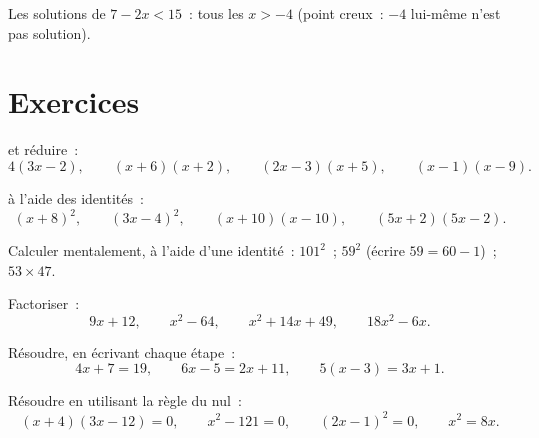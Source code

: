 \begin{omfigure}

{\small Les solutions de $7 - 2x < 15$~: tous les $x > -4$ (point
creux~: $-4$ lui-même n'est pas solution).}
\end{omfigure}

\section{Exercices}

\begin{exercise}[$\star$]\label{exo:g9:algebra:1}
 et réduire~:
\[
4(3x - 2), \qquad
(x + 6)(x + 2), \qquad
(2x - 3)(x + 5), \qquad
(x - 1)(x - 9).
\]
\end{exercise}

\begin{exercise}[$\star$]\label{exo:g9:algebra:2}
 à l'aide des identités~:
\[
(x + 8)^2, \qquad
(3x - 4)^2, \qquad
(x + 10)(x - 10), \qquad
(5x + 2)(5x - 2).
\]
\end{exercise}

\begin{exercise}[$\star$]\label{exo:g9:algebra:3}
Calculer mentalement, à l'aide d'une identité~: $101^2$~; \quad $59^2$
(écrire $59 = 60 - 1$)~; \quad $53 \times 47$.
\end{exercise}

\begin{exercise}[$\star$]\label{exo:g9:algebra:4}
Factoriser~:
\[
9x + 12, \qquad
x^2 - 64, \qquad
x^2 + 14x + 49, \qquad
18x^2 - 6x .
\]
\end{exercise}

\begin{exercise}[$\star$]\label{exo:g9:algebra:5}
Résoudre, en écrivant chaque étape~:
\[
4x + 7 = 19, \qquad
6x - 5 = 2x + 11, \qquad
5(x - 3) = 3x + 1 .
\]
\end{exercise}

\begin{exercise}[$\star\star$]\label{exo:g9:algebra:6}
Résoudre en utilisant la règle du  nul~:
\[
(x + 4)(3x - 12) = 0, \qquad
x^2 - 121 = 0, \qquad
(2x - 1)^2 = 0, \qquad
x^2 = 8x .
\]
\end{exercise}

